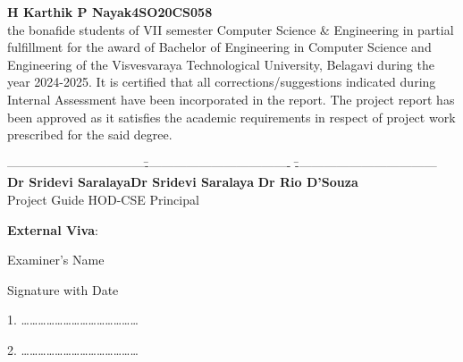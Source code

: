 \documentclass[12pt,a4paper]{report}
\begin{document}
    \textbf{\large \quad \quad \qquad H Karthik P Nayak}\qquad \qquad \qquad \qquad \textbf{\large 4SO20CS058}\\ \vspace{3pt}
    \justifying
    \noindent
    the bonafide students of VII semester Computer Science \& Engineering in partial fulfillment for the award of Bachelor of Engineering in Computer Science and Engineering of the Visvesvaraya Technological University, Belagavi during the year 2024-2025. It is certified that all corrections/suggestions indicated during Internal Assessment have been incorporated in the report. The project report has been approved as it satisfies the academic requirements in respect of project work prescribed for the said degree. 
    
    \par
    \vspace{0.25in}
    \begin{tabbing}
    ---------------------------------\hspace{0.3in}\=----------------------------------- \hspace{0.3in}\=---------------------------------- \\
    \textbf{Dr Sridevi Saralaya}\>\hspace{0.3in}\textbf{Dr Sridevi Saralaya }\>\hspace{0.3in}\textbf{Dr Rio D'Souza}\\
    \hspace{0.5in}Project Guide\>\hspace{0.50in} HOD-CSE \>\hspace{0.6in}Principal
    \end{tabbing}
    
    \begin{center}
    \large \textbf{External Viva}:
    \end{center}
    \begin{flushleft}
    \begin{normalsize}Examiner's Name \end{normalsize}
    \hspace{7.5cm}
    \begin{normalsize}Signature with Date\end{normalsize}
    \end{flushleft}
    
    \begin{flushleft}
    1. \ldots\ldots\ldots\ldots\ldots\ldots \ldots \hspace{5.8cm}\ldots\ldots\ldots\ldots \ldots\ldots\ldots 
    \par
    \vspace{0.1in}	
    2. \ldots\ldots\ldots\ldots\ldots\ldots \ldots \hspace{5.8cm}\ldots\ldots\ldots\ldots \ldots\ldots\ldots 
    \end{flushleft}
    \newpage
\end{document}
